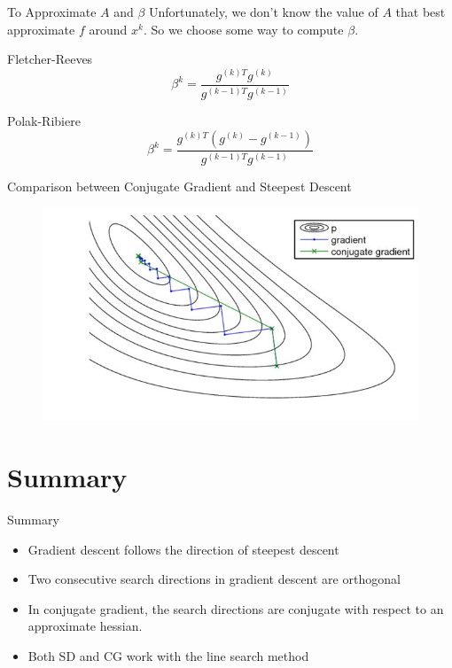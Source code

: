 \documentclass{beamer}
\begin{document}
\begin{frame}{To Approximate $A$ and $\beta$}
Unfortunately, we don't know the value of $A$ that best approximate $f$ around $x^k$. So we choose some way to compute $\beta$.

\begin{alertblock}{Fletcher-Reeves}
\begin{equation*}
    \beta^k = \frac{g^{(k)T} g^{(k)}}{g^{(k-1)T} g^{(k-1)}}
\end{equation*}
\end{alertblock}
\vfill
\begin{alertblock}{Polak-Ribiere}
\begin{equation*}
    \beta^k = \frac{g^{(k)T} (g^{(k)}-g^{(k-1)})}{g^{(k-1)T} g^{(k-1)}}
\end{equation*}
\end{alertblock}

\end{frame}


\begin{frame}{Comparison between Conjugate Gradient and Steepest Descent}
\begin{figure}
\centering
\includegraphics[width=120mm]{Lecture_notes/Figs/cg-sd.jpg}
\end{figure}
\end{frame}



\section{Summary}
\begin{frame}{Summary}
    \begin{itemize}
        \item Gradient descent follows the direction of steepest descent
        \item Two consecutive search directions in gradient descent are orthogonal
        \item In conjugate gradient, the search directions are conjugate with respect to an approximate hessian.
        \item Both SD and CG work with the line search method
    \end{itemize}
\end{frame}
\end{document}
